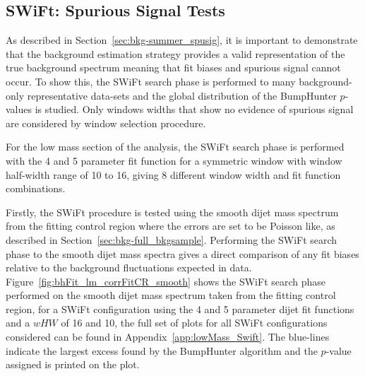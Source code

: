 
\newpage
\subsection{SWiFt: Spurious Signal Tests}
\label{sec:bkg-full_spuriousSignal}

As described in Section~\ref{sec:bkg-summer_spusig}, it is important to demonstrate that the background estimation strategy
provides a valid representation of the true background spectrum meaning that fit biases and spurious signal cannot occur.
To show this, the SWiFt search phase is performed to many background-only representative
data-sets and the global distribution of the {\sc BumpHunter} \mbox{$p$-values} is studied.
Only windows widths that show no evidence of spurious signal are considered by window selection procedure.



For the low mass section of the analysis,
the SWiFt search phase is performed with the 4 and 5 parameter fit function for a symmetric window with window half-width range of 10 to 16,
giving 8 different window width and fit function combinations.

Firstly, the SWiFt procedure is tested using the smooth dijet mass spectrum from the fitting control region
where the errors are set to be Poisson like,
as described in Section~\ref{sec:bkg-full_bkgsample}.
Performing the SWiFt search phase to the smooth dijet mass spectra gives a direct comparison
of any fit biases relative to the background fluctuations expected in data.
Figure~\ref{fig:bhFit_lm_corrFitCR_smooth} shows the SWiFt search phase
performed on the smooth dijet mass spectrum taken from the fitting control region,
for a SWiFt configuration using the 4 and 5 parameter dijet fit functions and a $wHW$ of 16 and 10,
the full set of plots for all SWiFt configurations considered can be found in Appendix~\ref{app:lowMass_Swift}.
The blue-lines indicate the largest excess found by the {\sc BumpHunter} algorithm and the \mbox{$p$-value} assigned is printed on the plot. 

